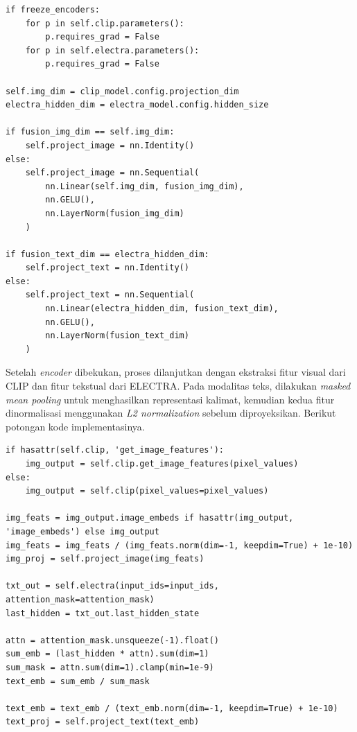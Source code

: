\begin{lstlisting}[caption={Kode Pembekuan \textit{Encoder} dan \textit{Projection Layer} pada Model Multimodal}, label={code:4.multimodal_projection}]
if freeze_encoders:
    for p in self.clip.parameters():
        p.requires_grad = False
    for p in self.electra.parameters():
        p.requires_grad = False

self.img_dim = clip_model.config.projection_dim
electra_hidden_dim = electra_model.config.hidden_size

if fusion_img_dim == self.img_dim:
    self.project_image = nn.Identity()
else:
    self.project_image = nn.Sequential(
        nn.Linear(self.img_dim, fusion_img_dim),
        nn.GELU(),
        nn.LayerNorm(fusion_img_dim)
    )

if fusion_text_dim == electra_hidden_dim:
    self.project_text = nn.Identity()
else:
    self.project_text = nn.Sequential(
        nn.Linear(electra_hidden_dim, fusion_text_dim),
        nn.GELU(),
        nn.LayerNorm(fusion_text_dim)
    )
\end{lstlisting}

Setelah \textit{encoder} dibekukan, proses dilanjutkan dengan ekstraksi fitur visual dari CLIP dan fitur tekstual dari ELECTRA. Pada modalitas teks, dilakukan \textit{masked mean pooling} untuk menghasilkan representasi kalimat, kemudian kedua fitur dinormalisasi menggunakan \textit{L2 normalization} sebelum diproyeksikan. Berikut potongan kode implementasinya.

\begin{lstlisting}[caption={Kode Ekstraksi Fitur pada Model Multimodal}, label={code:4.multimodal_features}]
if hasattr(self.clip, 'get_image_features'):
    img_output = self.clip.get_image_features(pixel_values)
else:
    img_output = self.clip(pixel_values=pixel_values)

img_feats = img_output.image_embeds if hasattr(img_output, 'image_embeds') else img_output
img_feats = img_feats / (img_feats.norm(dim=-1, keepdim=True) + 1e-10)
img_proj = self.project_image(img_feats)

txt_out = self.electra(input_ids=input_ids, attention_mask=attention_mask)
last_hidden = txt_out.last_hidden_state

attn = attention_mask.unsqueeze(-1).float()
sum_emb = (last_hidden * attn).sum(dim=1)
sum_mask = attn.sum(dim=1).clamp(min=1e-9)
text_emb = sum_emb / sum_mask

text_emb = text_emb / (text_emb.norm(dim=-1, keepdim=True) + 1e-10)
text_proj = self.project_text(text_emb)
\end{lstlisting}

